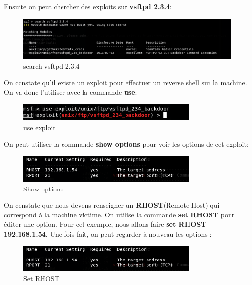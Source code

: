 Ensuite on peut chercher des exploits sur \textbf{vsftpd 2.3.4}:
\begin{figure}[htp!]
  \centering
  \setlength\figureheight{7cm}
  \setlength\figurewidth{9cm}
  \includegraphics[width=1\textwidth]{oui/Ancien/imangeancien/metasploit/ftp.PNG}
  \caption{search vsftpd 2.3.4}
  \label{fig:courbe-tikz}
\end{figure}

On constate qu'il existe un exploit pour effectuer un reverse shell sur la machine. On va donc l'utiliser avec la commande \textbf{use}:

\begin{figure}[htp!]
  \centering
  \setlength\figureheight{7cm}
  \setlength\figurewidth{9cm}
  \includegraphics[width=0.8\textwidth]{oui/Ancien/imangeancien/metasploit/ftp5.PNG}
  \caption{use exploit}
  \label{fig:courbe-tikz}
\end{figure}

\noindent On peut utiliser la commande \textbf{show options} pour voir les options de cet exploit:

\begin{figure}[htp!]
  \centering
  \setlength\figureheight{7cm}
  \setlength\figurewidth{9cm}
  \includegraphics[width=0.8\textwidth]{oui/Ancien/imangeancien/metasploit/ftp3.PNG}
  \caption{Show options}
  \label{fig:courbe-tikz}
\end{figure}

\newpage
On constate que nous devons renseigner un \textbf{RHOST}(Remote Host) qui correspond à la machine victime. On utilise la commande \textbf{set RHOST} pour éditer une option. Pour cet exemple, nous allons faire \textbf{set RHOST 192.168.1.54}. Une fois fait, on peut regarder à nouveau les options : 


\begin{figure}[htp!]
  \centering
  \setlength\figureheight{7cm}
  \setlength\figurewidth{9cm}
  \includegraphics[width=0.8\textwidth]{oui/Ancien/imangeancien/metasploit/ftp3.PNG}
  \caption{Set RHOST}
  \label{fig:courbe-tikz}
\end{figure}

